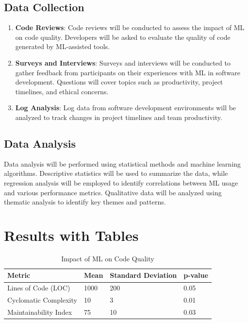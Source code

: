 \documentclass{article}
\begin{document}
\subsection{Data Collection}
\begin{enumerate}
    \item \textbf{Code Reviews}: Code reviews will be conducted to assess the impact of ML on code quality. Developers will be asked to evaluate the quality of code generated by ML-assisted tools.
    \item \textbf{Surveys and Interviews}: Surveys and interviews will be conducted to gather feedback from participants on their experiences with ML in software development. Questions will cover topics such as productivity, project timelines, and ethical concerns.
    \item \textbf{Log Analysis}: Log data from software development environments will be analyzed to track changes in project timelines and team productivity.
\end{enumerate}

\subsection{Data Analysis}
Data analysis will be performed using statistical methods and machine learning algorithms. Descriptive statistics will be used to summarize the data, while regression analysis will be employed to identify correlations between ML usage and various performance metrics. Qualitative data will be analyzed using thematic analysis to identify key themes and patterns.

\section{Results with Tables}
\begin{table}[ht]
    \centering
    \caption{Impact of ML on Code Quality}
    \label{tab:code_quality}
    \begin{tabular}{@{}llll@{}}
        \toprule
        \textbf{Metric} & \textbf{Mean} & \textbf{Standard Deviation} & \textbf{p-value} \\
        \midrule
        Lines of Code (LOC) & 1000 & 200 & 0.05 \\
        Cyclomatic Complexity & 10 & 3 & 0.01 \\
        Maintainability Index & 75 & 10 & 0.03 \\
        \bottomrule
    \end{tabular}
\end{table}
\end{document}
